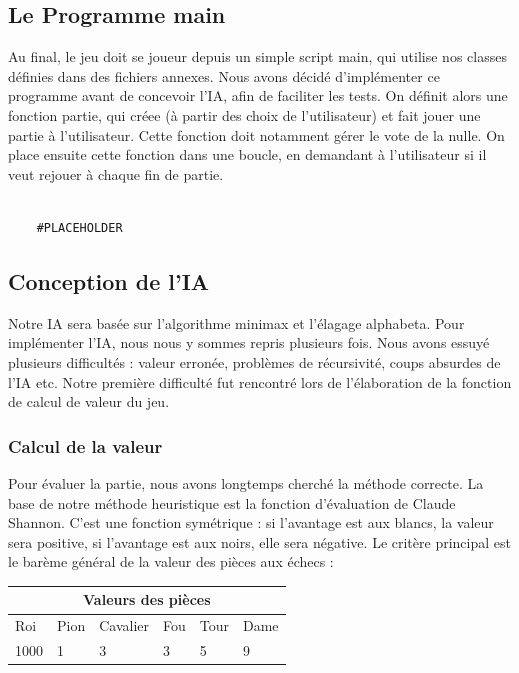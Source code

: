 \documentclass{article}
\begin{document}
\subsection{Le Programme main}
Au final, le jeu doit se joueur depuis un simple script main, qui utilise nos classes
définies dans des fichiers annexes.
Nous avons décidé d'implémenter ce programme avant de concevoir l'IA, 
afin de faciliter les tests.
On définit alors une fonction partie, qui créee (à partir des choix de l'utilisateur) et fait jouer une partie à l'utilisateur.
Cette fonction doit notamment gérer le vote de la nulle.
On place ensuite cette fonction dans une boucle, en demandant à l'utilisateur si il veut rejouer
à chaque fin de partie.
\begin{verbatim}

    #PLACEHOLDER
\end{verbatim}
\subsection{Conception de l'IA}
Notre IA sera basée sur l'algorithme minimax et l'élagage alphabeta.
Pour implémenter l'IA, nous nous y sommes repris plusieurs fois.
Nous avons essuyé plusieurs difficultés : valeur erronée, problèmes de récursivité, coups absurdes de l'IA etc.
Notre première difficulté fut rencontré lors de l'élaboration de la fonction de calcul de valeur du jeu.

\subsubsection{Calcul de la valeur}

Pour évaluer la partie, nous avons longtemps cherché la méthode correcte. 
La base de notre méthode heuristique
est la fonction d'évaluation de Claude Shannon. C'est une fonction symétrique : si l'avantage est aux blancs,
la valeur sera positive, si l'avantage est aux noirs, elle sera négative.
Le critère principal est le barème général de la valeur des pièces aux échecs : \\

\begin{center}
\begin{tabular}{ |p{1cm}||p{1cm}|p{1cm}|p{1cm}|p{1cm}|p{1cm}|  }
    \hline
    \multicolumn{6}{|c|}{Valeurs des pièces} \\
    \hline 
    Roi&Pion&Cavalier&Fou&Tour&Dame \\ 
    \hline 
1000&1&3&3&5&9 \\
\hline
\end{tabular} 
\end{center}
\end{document}
